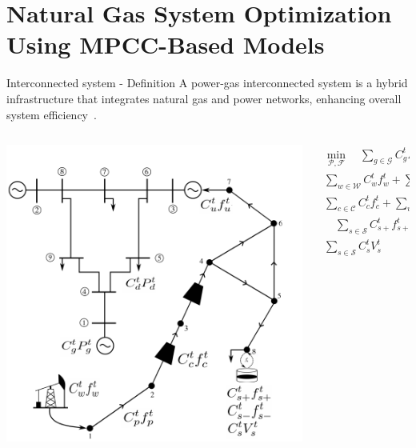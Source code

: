 \documentclass[hyperref={colorlinks,citecolor=blue,linkcolor=blue,urlcolor=blue}]{beamer}
\begin{document}
\section{Natural Gas System Optimization Using MPCC-Based Models}
\begin{frame}{Interconnected system - Definition}
A power-gas interconnected system is a hybrid infrastructure that integrates natural gas and power networks, enhancing overall system efficiency~\cite{Duan_Liu_Yang_2022}. 
\begin{columns}
\begin{column}{0.5\textwidth}
   \begin{center}
     \includegraphics[width=1\textwidth]{figures/network_math_alternative.pdf}
     \end{center}
\end{column}
\begin{column}{0.5\textwidth}  
\begin{equation} \label{eq:obj_func_integrated}
\begin{split}
\min_{\mathcal{P}, \mathcal{F}} \quad  \sum_{g \in \mathcal{G}} C_{g}^t {P_{g}^t} + \sum_{d \in \mathcal{D}} C_{d}^t {P_{d}^t} +  \\ \sum_{w \in \mathcal{W}} C_{w}^t {f_{w}^t} +  \sum_{p \in \mathcal{P}} C_{p}^t {f_{p}^t}  + \\ \sum_{c \in \mathcal{C}} C_{c}^t {f_{c}^t} + \sum_{u \in \mathcal{U}} C_{u}^{t} {f_{u}^{t}} + \\ \quad \sum_{s \in \mathcal{S}} C_{s+}^{t} {f_{s+}^{t}}  + \sum_{s \in \mathcal{S}} C_{s-}^{t} {f_{s-}^{t}} + \\ \sum_{s \in \mathcal{S}} C_{s}^{t} {V_{s}^{t}}
\end{split}
\end{equation} 
\end{column}
\end{columns}
\end{frame}
\end{document}
